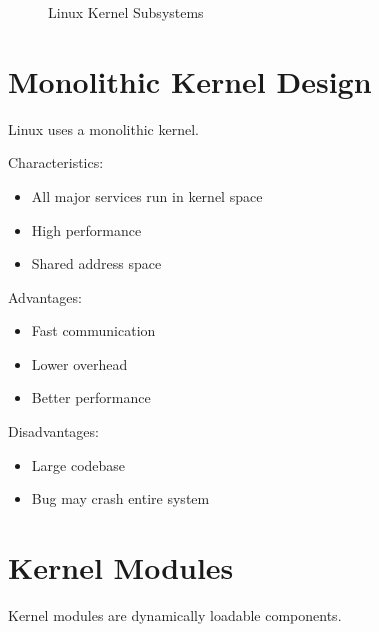 \begin{figure}[H]
\centering
{}
\caption{Linux Kernel Subsystems}
\end{figure}

\section{Monolithic Kernel Design}

Linux uses a monolithic kernel.

Characteristics:

\begin{itemize}
\item All major services run in kernel space
\item High performance
\item Shared address space
\end{itemize}

Advantages:

\begin{itemize}
\item Fast communication
\item Lower overhead
\item Better performance
\end{itemize}

Disadvantages:

\begin{itemize}
\item Large codebase
\item Bug may crash entire system
\end{itemize}

\section{Kernel Modules}

Kernel modules are dynamically loadable components.

